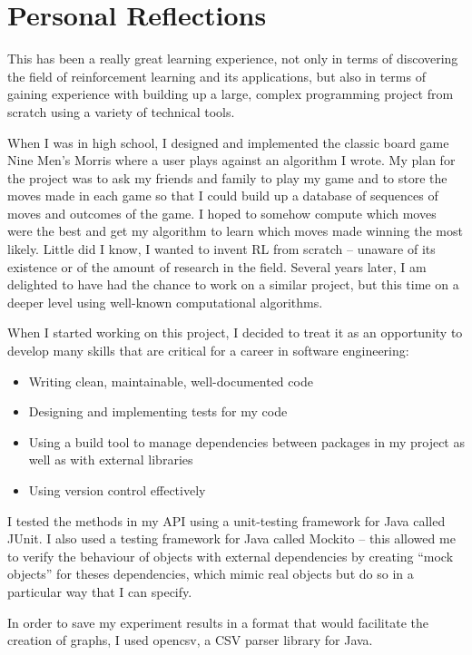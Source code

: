 \documentclass[11pt,a4paper]{report}
\begin{document}
\section{Personal Reflections}

This has been a really great learning experience, not only in terms of discovering the field of reinforcement learning and its applications, but also in terms of gaining experience with building up a large, complex programming project from scratch using a variety of technical tools.

When I was in high school, I designed and implemented the classic board game Nine Men’s Morris where a user plays against an algorithm I wrote. My plan for the project was to ask my friends and family to play my game and to store the moves made in each game so that I could build up a database of sequences of moves and outcomes of the game. I hoped to somehow compute which moves were the best and get my algorithm to learn which moves made winning the most likely. Little did I know, I wanted to invent RL from scratch – unaware of its existence or of the amount of research in the field. Several years later, I am delighted to have had the chance to work on a similar project, but this time on a deeper level using well-known computational algorithms.

When I started working on this project, I decided to treat it as an opportunity to develop many skills that are critical for a career in software engineering:

\begin{itemize}
	\item Writing clean, maintainable, well-documented code
	\item Designing and implementing tests for my code
	\item Using a build tool to manage dependencies between packages in my project as well as with external libraries
	\item Using version control effectively
\end{itemize}

I tested the methods in my API using a unit-testing framework for Java called JUnit. I also used a testing framework for Java called Mockito – this allowed me to verify the behaviour of objects with external dependencies by creating “mock objects” for theses dependencies, which mimic real objects but do so in a particular way that I can specify.

In order to save my experiment results in a format that would facilitate the creation of graphs, I used opencsv, a CSV parser library for Java.
\end{document}
